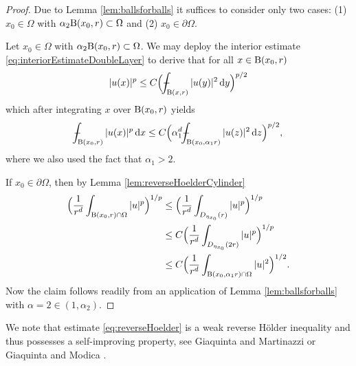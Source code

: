 \begin{proof}

  Due to Lemma \ref{lem:ballsforballs} it suffices to consider only two cases: (1) $x_0 \in \Omega$ with $\alpha_2 \mathrm{B}(x_0,r) \subset \Omega$ and (2) $x_0 \in \partial\Omega$.

  Let $x_0 \in \Omega$ with $\alpha_2 \mathrm{B}(x_0,r) \subset \Omega$. We may deploy the interior estimate \eqref{eq:interiorEstimateDoubleLayer} to derive that for all $x \in \mathrm{B}(x_0,r)$
  \begin{align*}
    |u(x)|^p \leq C \Big( \dashint_{\BB(x,r)} |u(y)|^2 \d y \Big)^{p/2}
  \end{align*}
  which after integrating $x$ over $\mathrm{B}(x_0, r)$ yields
  \begin{align*}
    \dashint_{\BB(x_0, r)} |u(x)|^p \d x \leq C \Big(\alpha_1^d  \dashint_{\BB(x_0, \alpha_1 r)} |u(z)|^2 \d z \Big)^{p/2},
  \end{align*}
  where we also used the fact that $\alpha_1 > 2$.

  If $x_0 \in \partial\Omega$, then by Lemma \ref{lem:reverseHoelderCylinder}
  \begin{align*}
    \Big( \frac{1}{r^d} \int_{\mathrm{B}(x_0, r) \cap \Omega} |u|^p \Big)^{1/p}
    &\leq \Big( \frac{1}{r^d} \int_{D_{\eta_{x_0}}(r)} |u|^p \Big)^{1/p} \\
    &\leq C \Big( \frac{1}{r^d} \int_{D_{\eta_{x_0}}(2 r)} |u|^p \Big)^{1/p} \\
    &\leq C \Big( \frac{1}{r^d} \int_{\mathrm{B}(x_0, \alpha_1 r) \cap \Omega} |u|^2 \Big)^{1/2}.
  \end{align*}
  Now the claim follows readily from an application of Lemma \ref{lem:ballsforballs} with $\alpha = 2 \in (1, \alpha_2)$.
\end{proof}

  We note that estimate \eqref{eq:reverseHoelder} is a weak reverse H\"older inequality and thus possesses a self-improving property, see Giaquinta and Martinazzi \cite[Thm. 6.38]{giaquintaMartinazzi} or Giaquinta and Modica \cite[Prop. 5.1]{giaquintaModica}.

